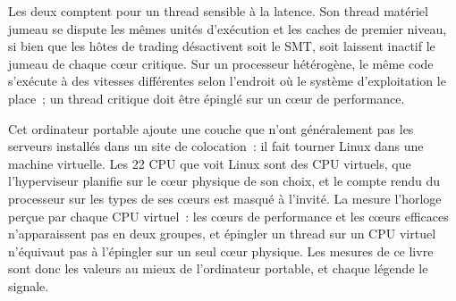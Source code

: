 Les deux comptent pour un thread sensible à la latence. Son thread matériel jumeau se dispute les mêmes unités d'exécution et
les caches de premier niveau, si bien que les hôtes de trading désactivent soit le SMT, soit laissent inactif le jumeau de chaque cœur critique. Sur un
processeur hétérogène, le même code s'exécute à des vitesses différentes selon l'endroit où le système d'exploitation le place~; un
thread critique doit être épinglé sur un cœur de performance.

Cet ordinateur portable ajoute une couche que n'ont généralement pas les serveurs installés dans un site de colocation~: il fait tourner Linux dans une
machine virtuelle. Les 22 CPU que voit Linux sont des CPU virtuels, que l'hyperviseur planifie sur le cœur physique de son choix,
et le compte rendu du processeur sur les types de ses cœurs est masqué à l'invité. La 
mesure l'horloge perçue par chaque CPU virtuel~: les cœurs de performance et les cœurs efficaces n'apparaissent pas en deux groupes, et
épingler un thread sur un CPU virtuel n'équivaut pas à l'épingler sur un seul cœur physique. Les mesures de ce livre sont donc les
valeurs au mieux de l'ordinateur portable, et chaque légende le signale.

\begin{omfigure}

\label{fig:ll:cpu-microarchitecture:freq}
\end{omfigure}

